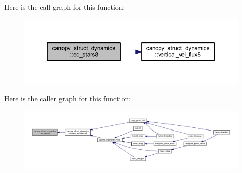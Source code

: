 Here is the call graph for this function\+:\nopagebreak
\begin{figure}[H]
\begin{center}
\leavevmode
\includegraphics[width=350pt]{namespacecanopy__struct__dynamics_a3a475e27ec763919f874021a412cf343_cgraph}
\end{center}
\end{figure}




Here is the caller graph for this function\+:\nopagebreak
\begin{figure}[H]
\begin{center}
\leavevmode
\includegraphics[width=350pt]{namespacecanopy__struct__dynamics_a3a475e27ec763919f874021a412cf343_icgraph}
\end{center}
\end{figure}


\hypertarget{namespacecanopy__struct__dynamics_a01dd30c6849ca1649aae28428c838730}{}
